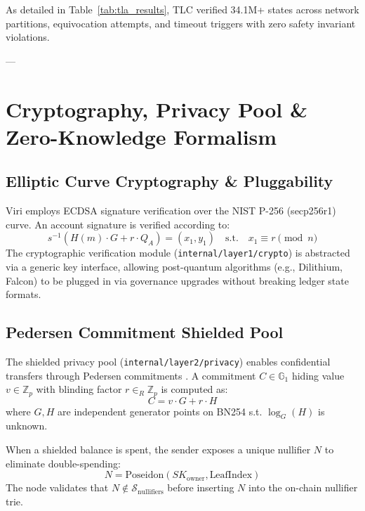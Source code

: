 \documentclass[10pt,journal,compsoc,twocolumn]{IEEEtran}
\begin{document}
As detailed in Table~\ref{tab:tla_results}, TLC verified 34.1M+ states across network partitions, equivocation attempts, and timeout triggers with zero safety invariant violations.

---

\section{Cryptography, Privacy Pool \& Zero-Knowledge Formalism}
\label{sec:crypto_zk}

\subsection{Elliptic Curve Cryptography \& Pluggability}
Viri employs ECDSA signature verification over the NIST P-256 (secp256r1) curve. An account signature is verified according to:
\begin{equation}
s^{-1} \left( H(m) \cdot G + r \cdot Q_A \right) = (x_1, y_1) \quad \text{s.t.} \quad x_1 \equiv r \pmod n
\end{equation}
The cryptographic verification module (\texttt{internal/layer1/crypto}) is abstracted via a generic key interface, allowing post-quantum algorithms (e.g., Dilithium, Falcon) to be plugged in via governance upgrades without breaking ledger state formats.

\subsection{Pedersen Commitment Shielded Pool}
The shielded privacy pool (\texttt{internal/layer2/privacy}) enables confidential transfers through Pedersen commitments \cite{pedersen1991non}. A commitment $C \in \mathbb{G}_1$ hiding value $v \in \mathbb{Z}_p$ with blinding factor $r \in_R \mathbb{Z}_p$ is computed as:
\begin{equation}
C = v \cdot G + r \cdot H
\label{eq:pedersen}
\end{equation}
where $G, H$ are independent generator points on BN254 s.t. $\log_G(H)$ is unknown.

When a shielded balance is spent, the sender exposes a unique nullifier $N$ to eliminate double-spending:
\begin{equation}
N = \text{Poseidon}\left( SK_{\text{owner}}, \text{LeafIndex} \right)
\label{eq:nullifier}
\end{equation}
The node validates that $N \notin \mathcal{S}_{\text{nullifiers}}$ before inserting $N$ into the on-chain nullifier trie.
\end{document}
